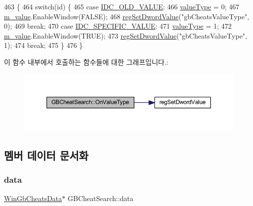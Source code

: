 \begin{DoxyCode}
463 \{
464   \textcolor{keywordflow}{switch}(\textcolor{keywordtype}{id}) \{
465   \textcolor{keywordflow}{case} \mbox{\hyperlink{resource_8h_a82e2e020fb1d5c999e3ffdd35e74dec7}{IDC\_OLD\_VALUE}}:
466     \mbox{\hyperlink{class_g_b_cheat_search_a86a4834163ee6a13a5bb8531a7c67c1d}{valueType}} = 0;
467     \mbox{\hyperlink{class_g_b_cheat_search_a95286f2e1e0637f2879a2dbe729d34c1}{m\_value}}.EnableWindow(FALSE);
468     \mbox{\hyperlink{_reg_8cpp_a758e775489a3fb5c3cc7071fdd5af87e}{regSetDwordValue}}(\textcolor{stringliteral}{"gbCheatsValueType"}, 0);
469     \textcolor{keywordflow}{break};
470   \textcolor{keywordflow}{case} \mbox{\hyperlink{resource_8h_aa1efc15f5ddbd77b1cc05bfb756a3567}{IDC\_SPECIFIC\_VALUE}}:
471     \mbox{\hyperlink{class_g_b_cheat_search_a86a4834163ee6a13a5bb8531a7c67c1d}{valueType}} = 1;
472     \mbox{\hyperlink{class_g_b_cheat_search_a95286f2e1e0637f2879a2dbe729d34c1}{m\_value}}.EnableWindow(TRUE);
473     \mbox{\hyperlink{_reg_8cpp_a758e775489a3fb5c3cc7071fdd5af87e}{regSetDwordValue}}(\textcolor{stringliteral}{"gbCheatsValueType"}, 1);   
474     \textcolor{keywordflow}{break};
475   \}
476 \}
\end{DoxyCode}
이 함수 내부에서 호출하는 함수들에 대한 그래프입니다.\+:
\nopagebreak
\begin{figure}[H]
\begin{center}
\leavevmode
\includegraphics[width=350pt]{class_g_b_cheat_search_a9f187d1fa0dfccbaa4a7a298284a2b8f_cgraph}
\end{center}
\end{figure}


\subsection{멤버 데이터 문서화}
\mbox{\label{class_g_b_cheat_search_a3b53d05af5d79a51830df8d06256e1fc}} 
\subsubsection{\texorpdfstring{data}{data}}
{\footnotesize\ttfamily \mbox{\hyperlink{struct_win_gb_cheats_data}{Win\+Gb\+Cheats\+Data}}$\ast$ G\+B\+Cheat\+Search\+::data\hspace{0.3cm}{\ttfamily [protected]}}



